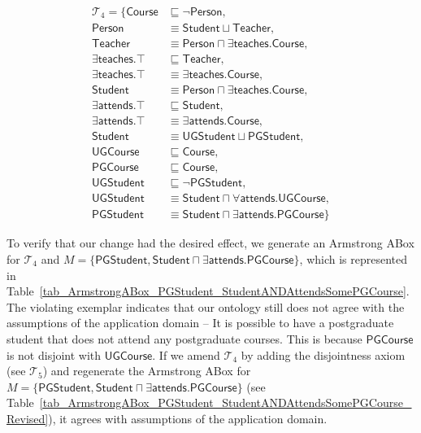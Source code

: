 \documentclass{amsart}
\begin{document}
    \begin{align*}
  \mathcal{T}_4 = \{\mathsf{Course} &\sqsubseteq \neg \mathsf{Person},\\
  \mathsf{Person} &\equiv \mathsf{Student} \sqcup \mathsf{Teacher}, \\ 
  \mathsf{Teacher} &\equiv \mathsf{Person} \sqcap \exists\mathsf{teaches}.\mathsf{Course}, \\
  \exists\mathsf{teaches}.\top &\sqsubseteq \mathsf{Teacher},\\
  \exists\mathsf{teaches}.\top &\equiv \exists\mathsf{teaches}.\mathsf{Course},\\
  \mathsf{Student} &\equiv \mathsf{Person} \sqcap \exists\mathsf{teaches}.\mathsf{Course}, \\
  \exists\mathsf{attends}.\top &\sqsubseteq \mathsf{Student},\\ 
  \exists\mathsf{attends}.\top &\equiv \exists\mathsf{attends}.\mathsf{Course},\\
  \mathsf{Student} &\equiv \mathsf{UGStudent} \sqcup \mathsf{PGStudent}, \\
  \mathsf{UGCourse} &\sqsubseteq \mathsf{Course},\\
  \mathsf{PGCourse} &\sqsubseteq \mathsf{Course},\\
   \mathsf{UGStudent} &\sqsubseteq \neg\mathsf{PGStudent},\\
  \mathsf{UGStudent} &\equiv\mathsf{Student} \sqcap  \forall\mathsf{attends}.\mathsf{UGCourse},\\
  \mathsf{PGStudent} &\equiv \mathsf{Student} \sqcap \exists\mathsf{attends}.\mathsf{PGCourse}\}
  \end{align*} 
 
 
 To verify that our change had the desired effect, we generate an Armstrong ABox for $\mathcal{T}_4$ and $M = \{\mathsf{PGStudent}, \mathsf{Student} \sqcap \exists\mathsf{attends}.\mathsf{PGCourse}\}$, which is represented in Table~\ref{tab_ArmstrongABox_PGStudent_StudentANDAttendsSomePGCourse}. The violating exemplar indicates that our ontology still does not agree with the assumptions of the application domain -- It is possible to have a postgraduate student that does not attend any postgraduate courses. This is because $\mathsf{PGCourse}$ is not disjoint with $\mathsf{UGCourse}$. If we amend $\mathcal{T}_4$ by adding the disjointness axiom (see $\mathcal{T}_5$) and regenerate the Armstrong ABox for $M = \{\mathsf{PGStudent}, \mathsf{Student} \sqcap \exists\mathsf{attends}.\mathsf{PGCourse}\}$ (see Table~\ref{tab_ArmstrongABox_PGStudent_StudentANDAttendsSomePGCourse_Revised}), it agrees with assumptions of the application domain.
 
\end{document}
